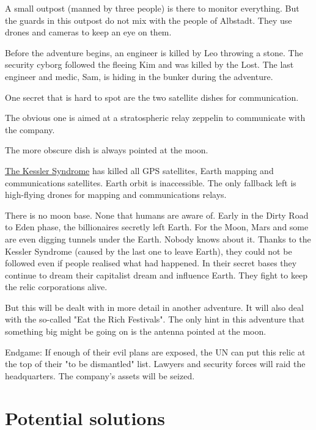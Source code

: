 A small outpost (manned by three people) is there to monitor everything. But the guards in this outpost do not mix with the people of Albstadt. They use drones and cameras to keep an eye on them.

Before the adventure begins, an engineer is killed by Leo throwing a stone. The security cyborg followed the fleeing Kim and was killed by the Lost.
The last engineer and medic, Sam, is hiding in the bunker during the adventure.

One secret that is hard to spot are the two satellite dishes for communication.

The obvious one is aimed at a stratospheric relay zeppelin to communicate with the company.

The more obscure dish is always pointed at the moon.

\begin{sidebarBox}[title=Kessler Syndrome]

    \hyperref[sec: Kessler Syndrome]{The Kessler Syndrome} has killed all GPS satellites, Earth mapping and communications satellites. Earth orbit is inaccessible. The only fallback left is high-flying drones for mapping and communications relays.
\end{sidebarBox}


\begin{sidebarBox}[title=Moon base]

    There is no moon base. None that humans are aware of. Early in the Dirty Road to Eden phase, the billionaires secretly left Earth. For the Moon, Mars and some are even digging tunnels under the Earth. Nobody knows about it. Thanks to the Kessler Syndrome (caused by the last one to leave Earth), they could not be followed even if people realised what had happened.
    In their secret bases they continue to dream their capitalist dream and influence Earth. They fight to keep the relic corporations alive.

    But this will be dealt with in more detail in another adventure. It will also deal with the so-called "Eat the Rich Festivals". The only hint in this adventure that something big might be going on is the antenna pointed at the moon.
\end{sidebarBox}

Endgame: If enough of their evil plans are exposed, the UN can put this relic at the top of their "to be dismantled" list. Lawyers and security forces will raid the headquarters. The company's assets will be seized.

\section{Potential solutions}

